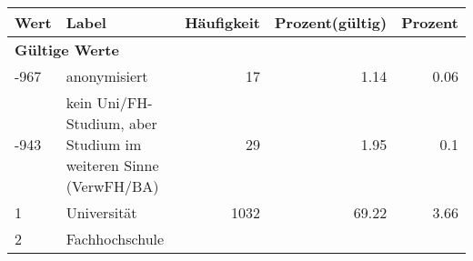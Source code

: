      \begin{longtable}{lXrrr}
     \toprule
     \textbf{Wert} & \textbf{Label} & \textbf{Häufigkeit} & \textbf{Prozent(gültig)} & \textbf{Prozent} \\
     \endhead
     \midrule
     \multicolumn{5}{l}{\textbf{Gültige Werte}}\\

     -967 &
     \multicolumn{1}{X}{ anonymisiert   } &


       \num{17} &
       \num[round-mode=places,round-precision=2]{1,14} &
         \num[round-mode=places,round-precision=2]{0,06} \\

     -943 &
     \multicolumn{1}{X}{ kein Uni/FH-Studium, aber Studium im weiteren Sinne (VerwFH/BA)   } &


       \num{29} &
       \num[round-mode=places,round-precision=2]{1,95} &
         \num[round-mode=places,round-precision=2]{0,1} \\

     1 &
     \multicolumn{1}{X}{ Universität   } &


       \num{1032} &
       \num[round-mode=places,round-precision=2]{69,22} &
         \num[round-mode=places,round-precision=2]{3,66} \\

     2 &
     \multicolumn{1}{X}{ Fachhochschule   } &



\end{longtable}
